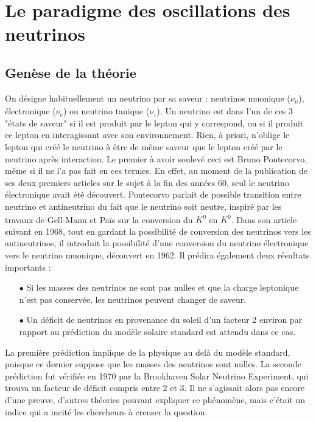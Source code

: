     \section{Le paradigme des oscillations des neutrinos}
    
        \subsection{Genèse de la théorie}
    
            On désigne habituellement un neutrino par sa saveur : neutrinos muonique ($\nu_{\mu}$), électronique ($\nu_e$) ou neutrino tauique ($\nu_{\tau}$). Un neutrino est dans l'un de ces 3 "états de saveur" si il est produit par le lepton qui y correspond, ou si il produit ce lepton en interagissant avec son environnement. Rien, à priori, n'oblige le lepton qui créé le neutrino à être de même saveur que le lepton créé par le neutrino après interaction. Le premier à avoir soulevé ceci est Bruno Pontecorvo, même si il ne l'a pas fait en ces termes. En effet, au moment de la publication de ses deux premiers articles\cite{Pontecorvo:1957cp,Pontecorvo:1957qd} sur le sujet à la fin des années 60, seul le neutrino électronique avait été découvert. Pontecorvo parlait de possible transition entre neutrino et antineutrino du fait que le neutrino soit neutre, inspiré par les travaux de Gell-Mann et Païs\cite{Gell-Mann1955} sur la conversion du $\overline{K^0}$ en  $K^0$. Dans son article suivant en 1968\cite{Pontecorvo1968}, tout en gardant la possibilité de conversion des neutrinos vers les antineutrinos, il introduit la possibilité d'une conversion du neutrino électronique vers le neutrino muonique, découvert en 1962\cite{Danby1962}. Il prédira également deux résultats importants :
            \begin{itemize}
                \item[$\bullet$] Si les masses des neutrinos ne sont pas nulles et que la charge leptonique n'est pas conservée, les neutrinos peuvent changer de saveur.
                \item[$\bullet$] Un déficit de neutrinos en provenance du soleil d'un facteur 2 environ par rapport au prédiction du modèle solaire standard est attendu dans ce cas.
            \end{itemize}
            La première prédiction implique de la physique au delà du modèle standard, puisque ce dernier suppose que les masses des neutrinos sont nulles. La seconde prédiction fut vérifiée en 1970 par la Brookhaven Solar Neutrino Experiment\cite{Bahcall1976}, qui trouva un facteur de déficit compris entre 2 et 3. Il ne s'agissait alors pas encore d'une preuve, d'autres théories pouvant expliquer ce phénomène, mais c'était un indice qui a incité les chercheurs à creuser la question.
            
